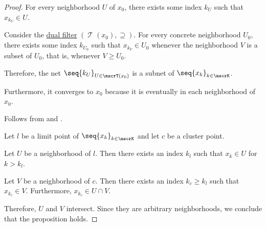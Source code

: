 \begin{proof}
  For every neighborhood \( U \) of \( x_0 \), there exists some index \( k_U \) such that \( x_{k_U} \in U \).

  Consider the \hyperref[ex:def:topological_net/reverse]{dual filter} \( (\mscrT(x_0), \supseteq) \). For every concrete neighborhood \( U_0 \), there exists some index \( k_{U_0} \) such that \( x_{k_V} \in U_0 \) whenever the neighborhood \( V \) is a subset of \( U_0 \), that is, whenever \( V \geq U_0 \).

  Therefore, the net \( \seq{ k_U }_{U \in \mscrT(x_0)} \) is a subnet of \( \seq{ x_k }_{k \in \mscrK} \).

  Furthermore, it converges to \( x_0 \) because it is eventually in each neighborhood of \( x_0 \).

  \NecessitySubProof* Follows from  and .

   Let \( l \) be a limit point of \( \seq{ x_k }_{k \in \mscrK} \) and let \( c \) be a cluster point.

  Let \( U \) be a neighborhood of \( l \). Then there exists an index \( k_l \) such that \( x_k \in U \) for \( k > k_l \).

  Let \( V \) be a neighborhood of \( c \). Then there exists an index \( k_c \geq k_l \) such that \( x_{k_c} \in V \). Furthermore, \( x_{k_c} \in U \cap V \).

  Therefore, \( U \) and \( V \) intersect. Since they are arbitrary neighborhoods, we conclude that the proposition holds.
\end{proof}

